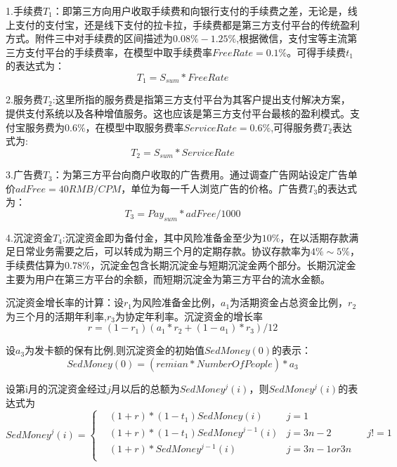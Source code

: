 \documentclass[withoutpreface,bwprint]{cumcmthesis} %
\begin{document}
1.手续费$T_1$：即第三方向用户收取手续费和向银行支付的手续费之差，无论是，线上支付的支付宝，还是线下支付的拉卡拉，手续费都是第三方支付平台的传统盈利方式。附件三中对手续费的区间描述为$0.08\%-1.25\%$,根据微信，支付宝等主流第三方支付平台的手续费率，在模型中取手续费率$FreeRate=0.1\%$。可得手续费$t_1$的表达式为：
\begin{equation}
T_1=S_{sum}*FreeRate
\end{equation}

2.服务费$T_2$:这里所指的服务费是指第三方支付平台为其客户提出支付解决方案，提供支付系统以及各种增值服务。这也应该是第三方支付平台最核的盈利模式。支付宝服务费为$0.6\%$，在模型中取服务费率$ServiceRate=​0.6\%$,可得服务费$T_2$表达式为:
\begin{equation}
T_2=S_{sum}*ServiceRate
\end{equation}

3.广告费$T_3$：为第三方平台向商户收取的广告费用。通过调查广告网站设定广告单价$adFree=40RMB/CPM$，单位为每一千人浏览广告的价格。广告费$T_3$的表达式为：
\begin{equation}
T_3=Pay_{sum}*adFree/1000
\end{equation}

4.沉淀资金$T_4$:沉淀资金即为备付金，其中风险准备金至少为$10\%$，在以活期存款满足日常业务需要之后，可以转成为期三个月的定期存款。协议存款率为$4\%\sim5\%$，手续费估算为$0.78\%$，沉淀金包含长期沉淀金与短期沉淀金两个部分。长期沉淀金主要为用户在第三方平台的余额，而短期沉淀金为第三方平台的流水金额。

沉淀资金增长率的计算：设$r_1$为风险准备金比例，$a_1$为活期资金占总资金比例，$r_2$为三个月的活期年利率,$r_3$为协定年利率。沉淀资金的增长率
\begin{equation}
r=(1-r_1)(a_1*r_2+(1-a_1)*r_3)/12
\end{equation}

设$a_3$为发卡额的保有比例,则沉淀资金的初始值$SedMoney(0)$的表示：
\begin{equation}
SedMoney(0)=(\overline {remian} * {NumberOfPeople})*a_3
\end{equation}

设第i月的沉淀资金经过$j$月以后的总额为$SedMoney^j(i)$，则$SedMoney^j(i)$的表达式为
\begin{equation}
SedMoney^j(i)=\left\{
\begin{aligned}
 & (1+r)*(1-t_1)SedMoney(i) &j=1\\
 & (1+r)*(1-t_1)SedMoney^{j-1}(i) &j=3n-2&&j != 1\\
&(1+r)*SedMoney^{j-1}(i)  & j=3n-1or3n\\
\end{aligned}
\right.
\end{equation}
\end{document}
